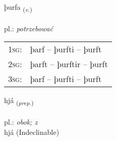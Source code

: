 \documentclass[frontgrid, backgrid]{flacards}\usepackage[]{graphicx}\usepackage[]{xcolor}
\begin{document}
\renewcommand{\flhead}{\vskip5pt \fboxsep=0pt {\small\bfseries\footnotesize Sagnorð | Verb}}
\renewcommand{\fcfoot}{\vskip5pt \fboxsep=0pt \hspace{2pt}{\small\bfseries\footnotesize 1K}}

\renewcommand{\blhead}{\vskip5pt {\small\bfseries\footnotesize Sagnorð | Verb }}
\renewcommand{\bcfoot}{\vskip5pt \hspace{2pt}{\small\bfseries\footnotesize 1K}}


{þurfa \small{\textsubscript{(\textit{v.})}} \\[1ex] %
\textphonetic{[θʏrva]} \\
pl.: \emph{potrzebować} \\  [2ex]
\renewcommand*{\arraystretch}{0.8}
\begin{tabular}{p{1cm}l}
\textsc{1sg}: & þarf -- þurfti -- þurft \\ 
\textsc{2sg}: & þarft -- þurftir -- þurft \\ 
\textsc{3sg}: & þarf -- þurfti -- þurft \\ 
\end{tabular}
}


\renewcommand{\flhead}{\vskip5pt \fboxsep=0pt {\small\bfseries\footnotesize Forsetning | Preposition}}
\renewcommand{\fcfoot}{\vskip5pt \fboxsep=0pt \hspace{2pt}{\small\bfseries\footnotesize 1K}}

\renewcommand{\blhead}{\vskip5pt {\small\bfseries\footnotesize Forsetning | Preposition }}
\renewcommand{\bcfoot}{\vskip5pt \hspace{2pt}{\small\bfseries\footnotesize 1K}}


{hjá \small{\textsubscript{(\textit{prep.})}} \\[1ex]
\textphonetic{[çauː]} \\
pl.: \emph{obok; z} \\  [2ex]
hjá (Indeclinable)}

\renewcommand{\flhead}{\vskip5pt \fboxsep=0pt {\small\bfseries\footnotesize Nafnorð | Noun}}
\renewcommand{\fcfoot}{\vskip5pt \fboxsep=0pt \hspace{2pt}{\small\bfseries\footnotesize 1K}}
\end{document}
